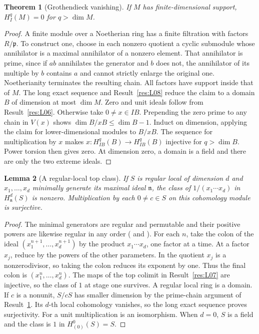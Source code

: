 \documentclass[11pt,oneside,openany]{book}
\newtheorem{theorem}{Theorem}[chapter]
\newtheorem{lemma}[theorem]{Lemma}
\theoremstyle{definition}
\theoremstyle{remark}
\begin{document}
\begin{theorem}[Grothendieck vanishing]\label{res:V02}
If \(M\) has finite-dimensional support, \(H_I^q(M)=0\) for
\(q>\dim M\).
\end{theorem}
\begin{proof}
A finite module over a Noetherian ring has a finite filtration
with factors \(R/\mathfrak p\). To construct one, choose in each
nonzero quotient a cyclic submodule whose annihilator is a maximal
annihilator of a nonzero element. That annihilator is prime, since
if \(ab\) annihilates the generator and \(b\) does not, the
annihilator of its multiple by \(b\) contains \(a\) and cannot
strictly enlarge the original one. Noetherianity terminates the
resulting chain. All factors have support inside that of \(M\).
The long exact sequence and Result~\ref{res:L08} reduce the claim
to a domain \(B\) of dimension at most \(\dim M\).
Zero and unit ideals follow from Result~\ref{res:L06}. Otherwise take
\(0\ne x\in IB\). Prepending the zero prime to any chain in \(V(x)\)
shows \(\dim B/xB\leq\dim B-1\). Induct on dimension, applying the
claim for lower-dimensional modules to \(B/xB\).
The sequence for multiplication by \(x\) makes
\(x:H^q_{IB}(B)\to H^q_{IB}(B)\) injective for \(q>\dim B\).
Power torsion then gives zero. At dimension zero, a domain is a field
and there are only the two extreme ideals.
\end{proof}

\begin{lemma}[A regular-local top class]\label{res:V03}
If \(S\) is regular local of dimension \(d\) and
\(x_1,\ldots,x_d\) minimally generate its maximal ideal \(\mathfrak n\),
the class of \(1/(x_1\cdots x_d)\) in \(H^d_{\mathfrak n}(S)\)
is nonzero. Multiplication by each \(0\ne c\in S\) on this
cohomology module is surjective.
\end{lemma}
\begin{proof}
The minimal generators are regular and permutable and their positive
powers are likewise regular in any order
(\cite[ALG-05-C03-S03]{p103} and \cite[RK-09, CM-08]{core}).
For each \(n\), take the colon of the ideal
\((x_1^{n+1},\ldots,x_d^{n+1})\) by the product \(x_1\cdots x_d\),
one factor at a time. At a factor \(x_j\), reduce by the powers of
the other parameters. In the quotient \(x_j\) is a nonzerodivisor,
so taking the colon reduces its exponent by one. Thus the final
colon is \((x_1^n,\ldots,x_d^n)\).
The maps of the top colimit in Result~\ref{res:L07} are injective,
so the class of \(1\) at stage one survives. A regular local ring is
a domain. If \(c\) is a nonunit, \(S/cS\) has smaller dimension by
the prime-chain argument of Result~\ref{res:V02}. Its \(d\)-th local
cohomology vanishes, so the long exact sequence proves surjectivity.
For a unit multiplication is an isomorphism. When \(d=0\), \(S\)
is a field and the class is \(1\) in \(H^0_{(0)}(S)=S\).
\end{proof}
\end{document}

